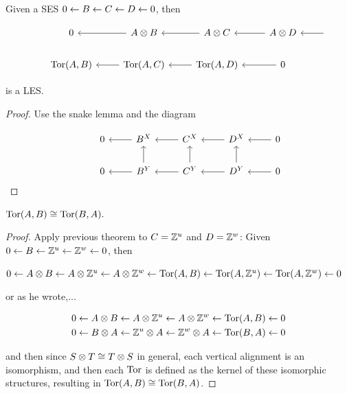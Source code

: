 \documentclass[11pt,leqno,oneside]{amsart}
\numberwithin{thm}{section}
\begin{document}
\begin{thm}
  Given a SES $0 \leftarrow B \leftarrow C \leftarrow D \leftarrow 0$, then

  $$\begin{tikzcd}
    & 0 & A \tprod B \arrow[l, ""] & A \tprod C \arrow[l, ""] & A \tprod D \arrow[l, ""] &\, \arrow[l, ""] \\
    & \Tor(A, B) & \Tor(A, C) \arrow[l, ""] & \Tor(A, D) \arrow[l, ""] & 0 \arrow[l, ""]
  \end{tikzcd}$$

  is a LES.
\end{thm}
\begin{proof}
  Use the snake lemma and the diagram

  $$\begin{tikzcd}
    & 0 & B^X \arrow[l, ""] & C^X \arrow[l, ""] & D^X \arrow[l, ""] & 0 \arrow[l, ""] \\
    & 0 & B^Y \arrow[l, ""] \arrow[u, ""] & C^Y \arrow[l, ""] \arrow[u, ""] & D^Y \arrow[l, ""] \arrow[u, ""] & 0 \arrow[l, ""]
  \end{tikzcd}$$
\end{proof}
\begin{thm}
  $\operatorname{Tor}(A, B) \mathrel{\cong} \operatorname{Tor}(B, A).$
\end{thm}
\begin{proof}
  Apply previous theorem to $C = {\mathbb Z}^u$ and $D = {\mathbb Z}^w$:  Given $0 \leftarrow B \leftarrow {\mathbb Z}^u \leftarrow {\mathbb Z}^w \leftarrow 0$, then

  $0 \leftarrow A \otimes B \leftarrow A \otimes {\mathbb Z}^u \leftarrow A \otimes {\mathbb Z}^w \leftarrow \operatorname{Tor}(A, B) \leftarrow \operatorname{Tor}(A, {\mathbb Z}^u) \leftarrow \operatorname{Tor}(A, {\mathbb Z}^w) \leftarrow 0$

  or as he wrote,...

  \begin{align}
    & 0 \leftarrow A \otimes B \leftarrow A \otimes {\mathbb Z}^u \leftarrow A \otimes {\mathbb Z}^w \leftarrow \operatorname{Tor}(A, B) \leftarrow 0 \\
    & 0 \leftarrow B \otimes A \leftarrow {\mathbb Z}^u \otimes A \leftarrow {\mathbb Z}^w \otimes A \leftarrow \operatorname{Tor}(B, A) \leftarrow 0
  \end{align}

  and then since $ S \otimes T \mathrel{\cong} T \otimes S$ in general, each vertical alignment is an isomorphism, and then each $\operatorname{Tor}$ is defined as the kernel of these isomorphic structures, resulting in $\operatorname{Tor}(A, B) \mathrel{\cong} \operatorname{Tor}(B, A)$.
\end{proof}
\end{document}
